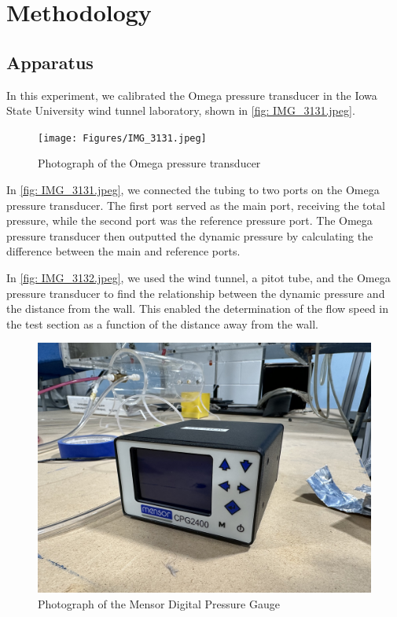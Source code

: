 \chapter{Methodology}
\label{cp:methodology}

\section{Apparatus}\label{sec:apparatus}

In this experiment, we calibrated the Omega pressure transducer in the Iowa State University wind tunnel laboratory, shown in \autoref{fig: IMG_3131.jpeg}.

\begin{figure}[htpb]
    \centering
    \texttt{[image: Figures/IMG\_3131.jpeg]}
    \caption[Photograph of the Omega pressure transducer]{Photograph of the Omega pressure transducer}
    \label{fig: IMG_3131.jpeg}
\end{figure}

In \autoref{fig: IMG_3131.jpeg}, we connected the tubing to two ports on the Omega pressure transducer. The first port served as the main port, receiving the total pressure, while the second port was the reference pressure port. The Omega pressure transducer then outputted the dynamic pressure by calculating the difference between the main and reference ports.

In \autoref{fig: IMG_3132.jpeg}, we used the wind tunnel, a pitot tube, and the Omega pressure transducer to find the relationship between the dynamic pressure and the distance from the wall. This enabled the determination of the flow speed in the test section as a function of the distance away from the wall.


\begin{figure}[htpb]
    \centering
    \includegraphics[width=0.75\linewidth]{Figures/IMG_3130.jpeg}
    \caption[Photograph of the Mensor Digital Pressure Gauge]{Photograph of the Mensor Digital Pressure Gauge}
    \label{fig: IMG_3130.jpeg}
\end{figure}

